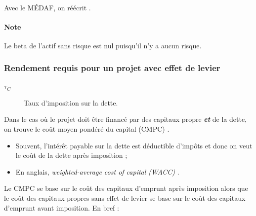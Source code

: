 \documentclass[10pt, french]{article}
\begin{document}
\begin{multicols*}{2}
\begin{definitionNOHFILLprop}
Avec le MÉDAF, on réécrit .\\
\end{definitionNOHFILLprop}

\paragraph{Note}	Le beta de l'actif sans risque est nul puisqu'il n'y a aucun risque.


\subsubsection{Rendement requis pour un projet avec effet de levier}
\begin{distributions}[Notation]
\begin{description}
	\item[$\tau_{C}$]	Taux d'imposition sur la dette.
\end{description}
\end{distributions}

Dans le cas où le projet doit être financé par des capitaux propre \textbf{\textit{et}} de la dette, on trouve le coût moyen pondéré du capital (CMPC) .
\begin{itemize}
	\item	Souvent, l'intérêt payable sur la dette est déductible d'impôts et donc on veut le coût de la dette après imposition ;
	\item	En anglais, \og \textit{weighted-average cost of capital (WACC)} \fg{}.
\end{itemize}

Le CMPC se base sur le coût des capitaux d'emprunt après imposition alors que le coût des capitaux propres sans effet de levier se base sur le coût des capitaux d'emprunt avant imposition. En bref :


\end{multicols*}
\end{document}
